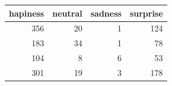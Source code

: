 \begin{tabular}{rrrr}
\toprule
hapiness & neutral & sadness & surprise \\
\midrule
356 & 20 & 1 & 124 \\
183 & 34 & 1 & 78 \\
104 & 8 & 6 & 53 \\
301 & 19 & 3 & 178 \\
\bottomrule
\end{tabular}
